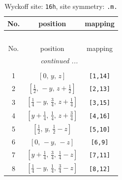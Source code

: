 \documentclass[fleqn,8pt]{jsarticle}
\begin{document}
\begin{longtable}{ccc}
\caption{Wyckoff site: {\tt 16h}, site symmetry: {\tt .m.}}
 \\
 \hline \hline
No. & position & mapping \\ \hline \endfirsthead

\multicolumn{2}{l}{\tablename\ \thetable{}} \\
 \hline \hline
No. & position & mapping \\ \hline \endhead

 \hline \hline
\multicolumn{2}{r}{\footnotesize\it continued ...} \\ \endfoot

 \hline \hline
\multicolumn{2}{r}{} \\ \endlastfoot

1 & $\left[ 0,\, y,\, z \right]$ & {\tt [1,14]} \\ \hline
2 & $\left[ \frac{1}{2},\, - y,\, z + \frac{1}{2} \right]$ & {\tt [2,13]} \\ \hline
3 & $\left[ \frac{1}{4} - y,\, \frac{3}{4},\, z + \frac{1}{4} \right]$ & {\tt [3,15]} \\ \hline
4 & $\left[ y + \frac{1}{4},\, \frac{1}{4},\, z + \frac{3}{4} \right]$ & {\tt [4,16]} \\ \hline
5 & $\left[ \frac{1}{2},\, y,\, \frac{1}{2} - z \right]$ & {\tt [5,10]} \\ \hline
6 & $\left[ 0,\, - y,\, - z \right]$ & {\tt [6,9]} \\ \hline
7 & $\left[ y + \frac{1}{4},\, \frac{3}{4},\, \frac{1}{4} - z \right]$ & {\tt [7,11]} \\ \hline
8 & $\left[ \frac{1}{4} - y,\, \frac{1}{4},\, \frac{3}{4} - z \right]$ & {\tt [8,12]} \\
\end{longtable}
\renewcommand{\arraystretch}{1.2}
\end{document}
